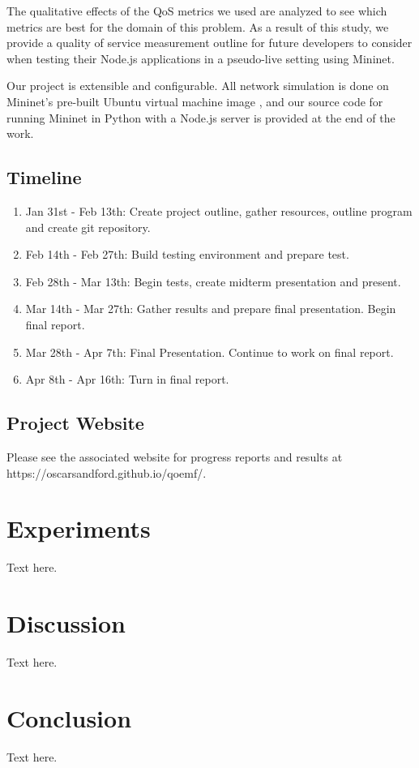 \documentclass{article}
\begin{document}
The qualitative effects of the QoS metrics we used are analyzed to see which metrics are best for the domain of this problem. As a result of this study, we provide a 
quality of service measurement outline for future developers to consider when testing their Node.js applications in a pseudo-live setting using Mininet. 

Our project is extensible and configurable. All network simulation is done on Mininet's pre-built Ubuntu virtual machine image \cite{mininet_github_2021}, and our 
source code for running Mininet in Python with a Node.js server is provided at the end of the work. 

\subsection{Timeline}
\begin{enumerate}
    \item Jan 31st - Feb 13th: Create project outline, gather resources, outline program and create git repository.
    \item Feb 14th - Feb 27th: Build testing environment and prepare test.
    \item Feb 28th - Mar 13th: Begin tests, create midterm presentation and present. 
    \item Mar 14th - Mar 27th: Gather results and prepare final presentation. Begin final report.
    \item Mar 28th - Apr 7th: Final Presentation. Continue to work on final report.
    \item Apr 8th - Apr 16th: Turn in final report.
\end{enumerate}

\subsection{Project Website}
Please see the associated website for progress reports and results at https://oscarsandford.github.io/qoemf/.

\section{Experiments}
Text here.

\section{Discussion}
Text here.

\section{Conclusion}
Text here.



\end{document}
